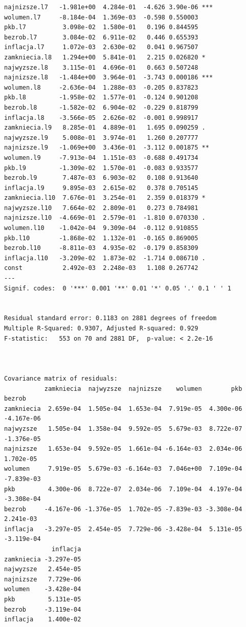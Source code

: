 \documentclass[
  polish,
  letterpaper,
  DIV=11,
  numbers=noendperiod]{scrartcl}
\begin{document}
\begin{verbatim}
najnizsze.l7   -1.981e+00  4.284e-01  -4.626 3.90e-06 ***
wolumen.l7     -8.184e-04  1.369e-03  -0.598 0.550003    
pkb.l7          3.098e-02  1.580e-01   0.196 0.844595    
bezrob.l7       3.084e-02  6.911e-02   0.446 0.655393    
inflacja.l7     1.072e-03  2.630e-02   0.041 0.967507    
zamkniecia.l8   1.294e+00  5.841e-01   2.215 0.026820 *  
najwyzsze.l8    3.115e-01  4.696e-01   0.663 0.507248    
najnizsze.l8   -1.484e+00  3.964e-01  -3.743 0.000186 ***
wolumen.l8     -2.636e-04  1.288e-03  -0.205 0.837823    
pkb.l8         -1.958e-02  1.577e-01  -0.124 0.901208    
bezrob.l8      -1.582e-02  6.904e-02  -0.229 0.818799    
inflacja.l8    -3.566e-05  2.626e-02  -0.001 0.998917    
zamkniecia.l9   8.285e-01  4.889e-01   1.695 0.090259 .  
najwyzsze.l9    5.008e-01  3.974e-01   1.260 0.207777    
najnizsze.l9   -1.069e+00  3.436e-01  -3.112 0.001875 ** 
wolumen.l9     -7.913e-04  1.151e-03  -0.688 0.491734    
pkb.l9         -1.309e-02  1.570e-01  -0.083 0.933577    
bezrob.l9       7.487e-03  6.903e-02   0.108 0.913640    
inflacja.l9     9.895e-03  2.615e-02   0.378 0.705145    
zamkniecia.l10  7.676e-01  3.254e-01   2.359 0.018379 *  
najwyzsze.l10   7.664e-02  2.809e-01   0.273 0.784981    
najnizsze.l10  -4.669e-01  2.579e-01  -1.810 0.070330 .  
wolumen.l10    -1.042e-04  9.309e-04  -0.112 0.910855    
pkb.l10        -1.868e-02  1.132e-01  -0.165 0.869005    
bezrob.l10     -8.811e-03  4.935e-02  -0.179 0.858309    
inflacja.l10   -3.209e-02  1.873e-02  -1.714 0.086710 .  
const           2.492e-03  2.248e-03   1.108 0.267742    
---
Signif. codes:  0 '***' 0.001 '**' 0.01 '*' 0.05 '.' 0.1 ' ' 1


Residual standard error: 0.1183 on 2881 degrees of freedom
Multiple R-Squared: 0.9307, Adjusted R-squared: 0.929 
F-statistic:   553 on 70 and 2881 DF,  p-value: < 2.2e-16 



Covariance matrix of residuals:
           zamkniecia  najwyzsze  najnizsze    wolumen        pkb     bezrob
zamkniecia  2.659e-04  1.505e-04  1.653e-04  7.919e-05  4.300e-06 -4.167e-06
najwyzsze   1.505e-04  1.358e-04  9.592e-05  5.679e-03  8.722e-07 -1.376e-05
najnizsze   1.653e-04  9.592e-05  1.661e-04 -6.164e-03  2.034e-06  1.702e-05
wolumen     7.919e-05  5.679e-03 -6.164e-03  7.046e+00  7.109e-04 -7.839e-03
pkb         4.300e-06  8.722e-07  2.034e-06  7.109e-04  4.197e-04 -3.308e-04
bezrob     -4.167e-06 -1.376e-05  1.702e-05 -7.839e-03 -3.308e-04  2.241e-03
inflacja   -3.297e-05  2.454e-05  7.729e-06 -3.428e-04  5.131e-05 -3.119e-04
             inflacja
zamkniecia -3.297e-05
najwyzsze   2.454e-05
najnizsze   7.729e-06
wolumen    -3.428e-04
pkb         5.131e-05
bezrob     -3.119e-04
inflacja    1.400e-02


\end{verbatim}
\end{document}
